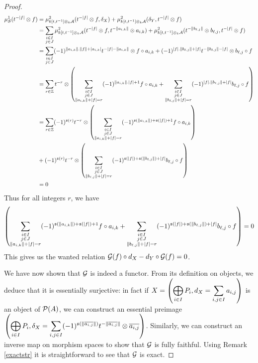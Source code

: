 \documentclass[12pt]{article}
\begin{document}
\begin{proof}
		\begin{align*}
			\mu^1_{{\cal{S}}}(t^{-|f|} \otimes f) &= \mu^2_{k[t,t^{-1}] \otimes_k {\cal{A}}}(t^{-|f|} \otimes f,\delta_X) + \mu^2_{k[t,t^{-1}] \otimes_k {\cal{A}}}(\delta_Y,t^{-|f|} \otimes f) \\
			&= \sum_{\substack{i \in I \\ j \in J}} \mu^2_{k[t,t^{-1}] \otimes_k {\cal{A}}}(t^{-|f|} \otimes f,t^{- \|a_{i,k}\|} \otimes a_{i,k}) +  \mu^2_{k[t,t^{-1}] \otimes_k {\cal{A}}}(t^{- \|b_{\ell,j}\|} \otimes b_{\ell,j},t^{-|f|} \otimes f) \\
			&= \sum_{\substack{i \in I \\ j \in J}} (-1)^{\|a_{i,k}\|.\|f\| + |a_{i,k}|} t^{-|f|-\|a_{i,k}\|} \otimes f \circ a_{i,k} +(-1)^{|f|.\|b_{\ell,j}\| + |f|} t^{-\|b_{\ell,j}\|-|f|} \otimes b_{\ell,j} \circ f \\
			&= \sum_{r \in \mathbb{Z}} t^{-r} \otimes \left(\sum_{\substack{i \in I \\ j \in J \\ \|a_{i,k}\|+|f| = r}} (-1)^{\|a_{i,k}\|.|f| + 1} f \circ a_{i,k} + \sum_{\substack{i \in I \\ j \in J \\ \|b_{\ell,j}\|+|f| = r}} (-1)^{|f|.\|b_{\ell,j}\| + |f|}  b_{\ell,j} \circ f \right) \\
			&= \sum_{r \in \mathbb{Z}} (-1)^{\mathfrak{s}(r)} t^{-r} \otimes \left( \sum_{\substack{i \in I \\ j \in J \\ \|a_{i,k}\|+|f| = r}} (-1)^{\mathfrak{s}(\|a_{i,k}\|)+\mathfrak{s}(|f|) + 1} f \circ a_{i,k} \right) \\
			& + (-1)^{\mathfrak{s}(r)} t^{-r} \otimes \left(\sum_{\substack{i \in I \\ j \in J \\ \|b_{\ell,j}\|+|f| = r}} (-1)^{\mathfrak{s}(|f|)+\mathfrak{s}(\|b_{\ell,j}\|) + |f|}  b_{\ell,j} \circ f \right)  \\
			&= 0
		\end{align*}
		Thus for all integers $r$, we have 
		\[\left(\sum_{\substack{i \in I \\ j \in J \\ \|a_{i,k}\|+|f| = r}} (-1)^{\mathfrak{s}(\|a_{i,k}\|)+\mathfrak{s}(|f|) + 1} f \circ a_{i,k} + \sum_{\substack{i \in I \\ j \in J \\ \|b_{\ell,j}\|+|f| = r}} (-1)^{\mathfrak{s}(|f|)+\mathfrak{s}(\|b_{\ell,j}\|) + |f|}  b_{\ell,j} \circ f \right) = 0\]
		This gives us the wanted relation ${\cal{G}}(f) \circ d_X - d_Y \circ {\cal{G}}(f) = 0$. 
		
		We have now shown that ${\cal{G}}$ is indeed a functor. From its definition on objects, we deduce that it is essentially surjective: in fact if $X = \left(\displaystyle\bigoplus_{i \in I} P_i, d_X = \sum_{i,j \in I} a_{i,j}\right)$ is an object of ${\cal{P}}(A)$, we can construct an essential preimage $\left(\displaystyle\bigoplus_{i \in I} P_i, \delta_X = \sum_{i,j \in I} (-1)^{\mathfrak{s}(\|\overline{a_{i,j}}\|)}t^{-\|\overline{a_{i,j}}\|} \otimes \overline{a_{i,j}}\right)$. Similarly, we can construct an inverse map on morphism spaces to show that ${\cal{G}}$ is fully faithful.
		Using Remark \ref{exactstr} it is straightforward to see that ${\cal{G}}$ is exact.
	\end{proof}
	
\end{document}

